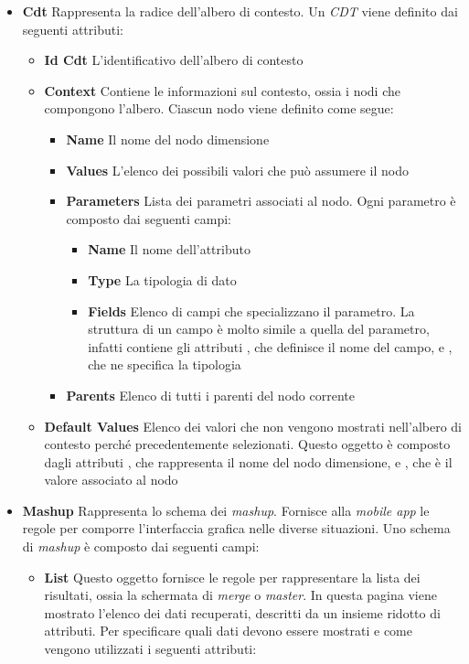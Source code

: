 \begin{itemize}
	\item \textbf{Cdt}
	Rappresenta la radice dell'albero di contesto. Un \emph{CDT} viene definito dai seguenti attributi:
	\begin{itemize}
		\item \textbf{Id Cdt}
		L'identificativo dell'albero di contesto
		\item \textbf{Context}
		Contiene le informazioni sul contesto, ossia i nodi che compongono l'albero. Ciascun nodo viene definito come segue:
		\begin{itemize}
			\item \textbf{Name}
			Il nome del nodo dimensione
			\item \textbf{Values}
			L'elenco dei possibili valori che può assumere il nodo
			\item \textbf{Parameters}
			Lista dei parametri associati al nodo. Ogni parametro è composto dai seguenti campi:
			\begin{itemize}
				\item \textbf{Name}
				Il nome dell'attributo
				\item \textbf{Type}
				La tipologia di dato
				\item \textbf{Fields}
				Elenco di campi che specializzano il parametro. La struttura di un campo è molto simile a quella del parametro, infatti contiene gli attributi , che definisce il nome del campo, e , che ne specifica la tipologia
			\end{itemize}
			\item \textbf{Parents}
			Elenco di tutti i parenti del nodo corrente
		\end{itemize}
		\item \textbf{Default Values}
		Elenco dei valori che non vengono mostrati nell'albero di contesto perché precedentemente selezionati. Questo oggetto è composto dagli attributi , che rappresenta il nome del nodo dimensione, e , che è il valore associato al nodo
	\end{itemize}
	\item \textbf{Mashup}
	Rappresenta lo schema dei \emph{mashup}. Fornisce alla \emph{mobile app} le regole per comporre l'interfaccia grafica nelle diverse situazioni. Uno schema di \emph{mashup} è composto dai seguenti campi:
	\begin{itemize}
		\item \textbf{List}
		Questo oggetto fornisce le regole per rappresentare la lista dei risultati, ossia la schermata di \emph{merge} o \emph{master}. In questa pagina viene mostrato l'elenco dei dati recuperati, descritti da un insieme ridotto di attributi. Per specificare quali dati devono essere mostrati e come vengono utilizzati i seguenti attributi:

\end{itemize}
\end{itemize}

